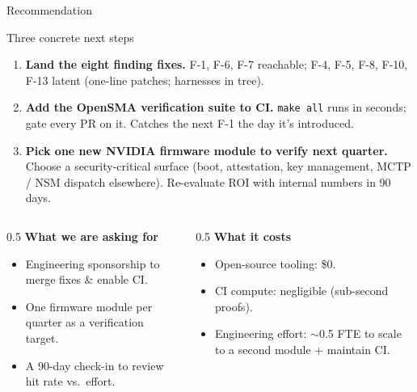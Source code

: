 \documentclass[aspectratio=169,11pt]{beamer}
\newcommand{\hil}[1]{\textbf{\textcolor{nvgreendark}{#1}}}
\begin{document}
\begin{frame}{Recommendation}
  \begin{block}{Three concrete next steps}
    \begin{enumerate}
      \item \hil{Land the eight finding fixes.}
            F-1, F-6, F-7 reachable; F-4, F-5, F-8, F-10, F-13 latent
            (one-line patches; harnesses in tree).
      \item \hil{Add the OpenSMA verification suite to CI.}
            \texttt{make all} runs in seconds; gate every PR on it.
            Catches the next F-1 the day it's introduced.
      \item \hil{Pick one new NVIDIA firmware module to verify next quarter.}
            Choose a security-critical surface (boot, attestation, key
            management, MCTP / NSM dispatch elsewhere). Re-evaluate ROI
            with internal numbers in 90 days.
    \end{enumerate}
  \end{block}

  \vspace{0.4em}
  \begin{columns}[T,onlytextwidth]
    \begin{column}{0.5\textwidth}
      \textbf{What we are asking for}
      \begin{itemize}
        \footnotesize
        \item Engineering sponsorship to merge fixes \& enable CI.
        \item One firmware module per quarter as a verification target.
        \item A 90-day check-in to review hit rate vs.\ effort.
      \end{itemize}
    \end{column}
    \begin{column}{0.5\textwidth}
      \textbf{What it costs}
      \begin{itemize}
        \footnotesize
        \item Open-source tooling: \$0.
        \item CI compute: negligible (sub-second proofs).
        \item Engineering effort: $\sim$0.5 FTE to scale to a
              second module + maintain CI.
      \end{itemize}
    \end{column}
  \end{columns}
\end{frame}
\end{document}
